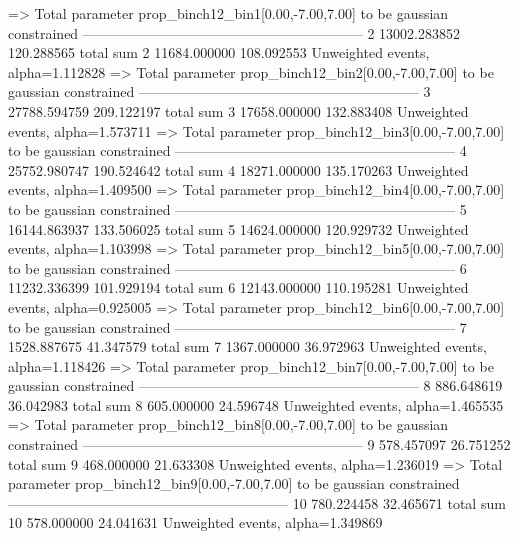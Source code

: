   => Total parameter prop_binch12_bin1[0.00,-7.00,7.00] to be gaussian constrained
------------------------------------------------------------
2          13002.283852    120.288565      total sum                     
2          11684.000000    108.092553      Unweighted events, alpha=1.112828
  => Total parameter prop_binch12_bin2[0.00,-7.00,7.00] to be gaussian constrained
------------------------------------------------------------
3          27788.594759    209.122197      total sum                     
3          17658.000000    132.883408      Unweighted events, alpha=1.573711
  => Total parameter prop_binch12_bin3[0.00,-7.00,7.00] to be gaussian constrained
------------------------------------------------------------
4          25752.980747    190.524642      total sum                     
4          18271.000000    135.170263      Unweighted events, alpha=1.409500
  => Total parameter prop_binch12_bin4[0.00,-7.00,7.00] to be gaussian constrained
------------------------------------------------------------
5          16144.863937    133.506025      total sum                     
5          14624.000000    120.929732      Unweighted events, alpha=1.103998
  => Total parameter prop_binch12_bin5[0.00,-7.00,7.00] to be gaussian constrained
------------------------------------------------------------
6          11232.336399    101.929194      total sum                     
6          12143.000000    110.195281      Unweighted events, alpha=0.925005
  => Total parameter prop_binch12_bin6[0.00,-7.00,7.00] to be gaussian constrained
------------------------------------------------------------
7          1528.887675     41.347579       total sum                     
7          1367.000000     36.972963       Unweighted events, alpha=1.118426
  => Total parameter prop_binch12_bin7[0.00,-7.00,7.00] to be gaussian constrained
------------------------------------------------------------
8          886.648619      36.042983       total sum                     
8          605.000000      24.596748       Unweighted events, alpha=1.465535
  => Total parameter prop_binch12_bin8[0.00,-7.00,7.00] to be gaussian constrained
------------------------------------------------------------
9          578.457097      26.751252       total sum                     
9          468.000000      21.633308       Unweighted events, alpha=1.236019
  => Total parameter prop_binch12_bin9[0.00,-7.00,7.00] to be gaussian constrained
------------------------------------------------------------
10         780.224458      32.465671       total sum                     
10         578.000000      24.041631       Unweighted events, alpha=1.349869
